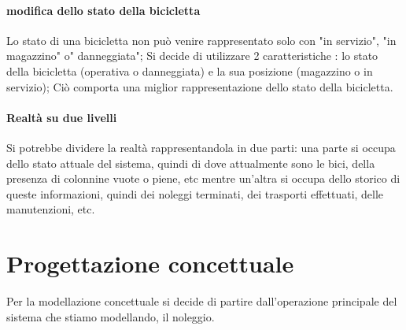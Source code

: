 \documentclass[a4paper,twoside]{article}
\begin{document}
\paragraph{modifica dello stato della bicicletta} Lo stato di una bicicletta non può venire rappresentato solo con "in servizio", "in magazzino" o" danneggiata"; Si decide di utilizzare 2 caratteristiche : lo stato della bicicletta (operativa o danneggiata) e la sua posizione (magazzino o in servizio); Ciò comporta una miglior rappresentazione dello stato della bicicletta.
\paragraph{Realtà su due livelli} Si potrebbe dividere la realtà rappresentandola in due parti: una parte si occupa dello stato attuale del sistema, quindi di dove attualmente sono le bici, della presenza di colonnine vuote o piene, etc mentre un'altra si occupa dello storico di queste informazioni, quindi dei noleggi terminati, dei trasporti effettuati, delle manutenzioni, etc.

\section{Progettazione concettuale}

Per la modellazione concettuale si decide di partire dall'operazione principale del sistema che stiamo modellando, il noleggio.
\end{document}
